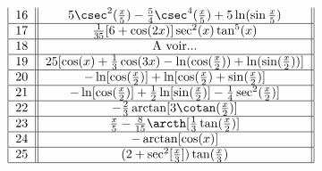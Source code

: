 \[\begin{tabular}{| c || c ||  }
              $16$  &  $5\csec^2(\frac{x}{5})-\frac{5}{4}\csec^4( \frac{x}{5})+5\ln(\sin \frac{x}{5})$			                                                               \\ \hline   
              $17$  & $\frac{1}{35}[6+\cos(2x)]\sec^2(x)\tan^5(x)$		                                                               \\ \hline   
              $18$  &  A voir...                                                               \\ \hline   
              $19$  &  $25[\cos(x)+\frac{1}{3}\cos(3x)-\ln(\cos(\frac{x}{2}))+\ln(\sin(\frac{x}{2}))]$			                                                               \\ \hline   
              $20$  & $-\ln[\cos(\frac{x}{2} )]+\ln[\cos(\frac{x}{2})+\sin(\frac{x}{2})]$                                                          \\ \hline   
              $21$  &  $-\ln[\cos(\frac{x}{2} )]+\frac{1}{2} \ln[\sin(\frac{x}{2})]-\frac{1}{4} \sec^2(\frac{x}{2})]$			                                                               \\ \hline   
              $22$  &  $-\frac{2}{3}\arctan[3\cotan(\frac{x}{2})]$			                                                               \\ \hline   
              $23$  &  $\frac{x}{5}-\frac{8}{15}\arcth[\frac{1}{3}\tan(\frac{x}{2})]$			                                                               \\ \hline   
              $24$  &  $-\arctan[\cos(x)]$			                                                               \\ \hline   
              $25$  &  $(2+\sec^2[\frac{x}{3}])\tan(\frac{x}{3})$			                                                               \\ \hline   

\end{tabular} \]


